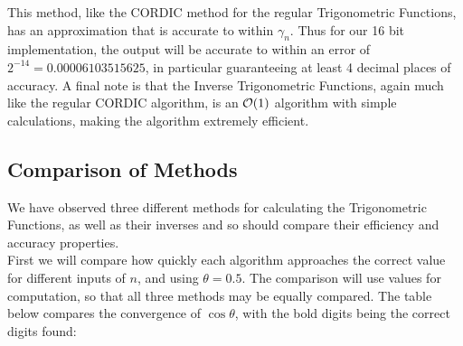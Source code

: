 {This method, like the CORDIC method for the regular Trigonometric Functions, has an approximation that is accurate to within \(\gamma_n\). Thus for our 16 bit implementation, the output will be accurate to within an error of \(2^{-14} = 0.00006103515625\), in particular guaranteeing at least 4 decimal places of accuracy. A final note is that the Inverse Trigonometric Functions, again much like the regular CORDIC algorithm, is an \(\mathcal{O}(1)\) algorithm with simple calculations, making the algorithm extremely efficient.

\subsection{Comparison of Methods}

We have observed three different methods for calculating the Trigonometric Functions, as well as their inverses and so should compare their efficiency and accuracy properties.\\

First we will compare how quickly each algorithm approaches the correct value for different inputs of \(n\), and using \(\theta = 0.5\). The comparison will use  values for computation, so that all three methods may be equally compared. The table below compares the convergence of \(\cos\theta\), with the bold digits being the correct digits found:

}
